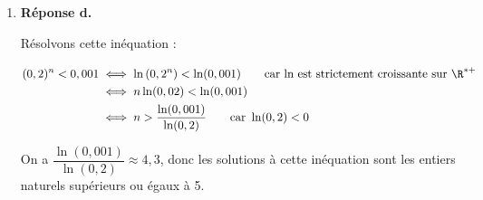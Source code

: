 \begin{enumerate}
			$\forall x \in \R, \quad 1 \times \mathrm{e}^x + x \times \mathrm{e}^x = (1 + x)\mathrm{e}^x$.

			On a donc $f'(1) = (1 + 1)\mathrm{e}^1 = 2\mathrm{e}$.

			Par ailleurs $f(1) = 1\times \mathrm{e}^1 = \mathrm{e}$.

			L'équation réduite de la tangente à la courbe de $f$ au point d'abscisse 1 est donc :
			$\aligned[t] y &= f'(1) (x - 1) + f(1)\\ &= 2\mathrm{e} (x - 1) + \mathrm{e} \\&= 2\mathrm{e}x - 2\mathrm{e} + \mathrm{e} \\y&= 2\mathrm{e}x - \mathrm{e}\endaligned$

			\item \textbf{Réponse d.}

			Résolvons cette inéquation :

			$ \aligned [t] (0,2)^n < 0,001 &\iff \ln\left(0,2^n\right) < \ln(0,001) \text{\qquad car ln est strictement croissante sur }\R^{*+}\\
			&\iff n\ln(0,02) < \ln(0,001)\\
			&\iff n > \dfrac{\ln(0,001)}{\ln(0,2)} \text{\qquad car } \ln(0,2)< 0
			\endaligned$

			On a $\dfrac{\ln(0,001)}{\ln(0,2)} \approx 4,3$, donc les solutions à cette inéquation sont les entiers naturels supérieurs ou égaux à 5.
		\end{enumerate}

\bigskip

